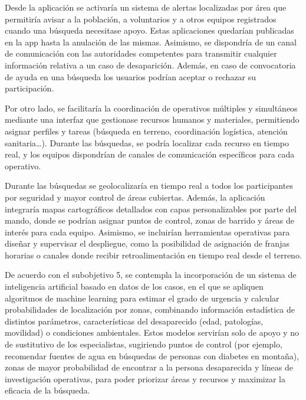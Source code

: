     
    Desde la aplicación se activaría un sistema de alertas localizadas por área que permitiría avisar a la población, a voluntarios y a otros equipos registrados cuando una búsqueda necesitase apoyo. Estas aplicaciones quedarían publicadas en la app hasta la anulación de las mismas. Asimismo, se dispondría de un canal de comunicación con las autoridades competentes para transmitir cualquier información relativa a un caso de desaparición. Además, en caso de convocatoria de ayuda en una búsqueda los usuarios podrían aceptar o rechazar su participación. 
    
    Por otro lado, se facilitaría la coordinación de operativos múltiples y simultáneos mediante una interfaz que gestionase recursos humanos y materiales, permitiendo asignar perfiles y tareas (búsqueda en terreno, coordinación logística, atención sanitaria…). Durante las búsquedas, se podría localizar cada recurso en tiempo real, y los equipos dispondrían de canales de comunicación específicos para cada operativo.
    
    Durante las búsquedas se geolocalizaría en tiempo real a todos los participantes por seguridad y mayor control de áreas cubiertas. Además, la aplicación integraría mapas cartográficos detallados con capas personalizables por parte del mando, donde se podrían asignar puntos de control, zonas de barrido y áreas de interés para cada equipo. Asimismo, se incluirían herramientas operativas para diseñar y supervisar el despliegue, como la posibilidad de asignación de franjas horarias o canales donde recibir retroalimentación en tiempo real desde el terreno. 
    
    De acuerdo con el subobjetivo 5, se contempla la incorporación de un sistema de inteligencia artificial basado en datos de los casos, en el que se apliquen algoritmos de machine learning para estimar el grado de urgencia y calcular probabilidades de localización por zonas, combinando información estadística de distintos parámetros, características del desaparecido (edad, patologías, movilidad) o condiciones ambientales. Estos modelos servirían solo de apoyo y no de sustitutivo de los especialistas, sugiriendo puntos de control (por ejemplo, recomendar fuentes de agua en búsquedas de personas con diabetes en montaña), zonas de mayor probabilidad de encontrar a la persona desaparecida y líneas de investigación operativas, para poder priorizar áreas y recursos y maximizar la eficacia de la búsqueda.

